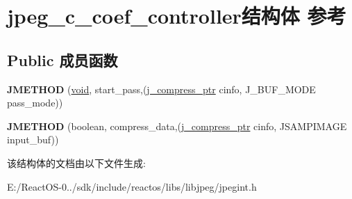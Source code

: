 \hypertarget{structjpeg__c__coef__controller}{}\section{jpeg\+\_\+c\+\_\+coef\+\_\+controller结构体 参考}
\label{structjpeg__c__coef__controller}
\subsection*{Public 成员函数}
\begin{DoxyCompactItemize}
\item 
\mbox{\label{structjpeg__c__coef__controller_a975b8ac2bcd4ea8065eb676ea805d78e}} 
{\bfseries J\+M\+E\+T\+H\+OD} (\hyperlink{interfacevoid}{void}, start\+\_\+pass,(\hyperlink{structjpeg__compress__struct}{j\+\_\+compress\+\_\+ptr} cinfo, J\+\_\+\+B\+U\+F\+\_\+\+M\+O\+DE pass\+\_\+mode))
\item 
\mbox{\label{structjpeg__c__coef__controller_a1aaf8a93ba0bd239b36f4d48657c88ee}} 
{\bfseries J\+M\+E\+T\+H\+OD} (boolean, compress\+\_\+data,(\hyperlink{structjpeg__compress__struct}{j\+\_\+compress\+\_\+ptr} cinfo, J\+S\+A\+M\+P\+I\+M\+A\+GE input\+\_\+buf))
\end{DoxyCompactItemize}


该结构体的文档由以下文件生成\+:\begin{DoxyCompactItemize}
\item 
E\+:/\+React\+O\+S-\/0../sdk/include/reactos/libs/libjpeg/jpegint.\+h\end{DoxyCompactItemize}
